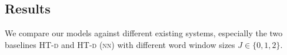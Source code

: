 \documentclass[11pt,a4paper]{article}
\begin{document}
{{%
%	

\subsection{Results}
We compare our models against different existing systems, especially the two baselines \textsc{HT-d} \cite{Luw:15} and \textsc{HT-d} \textsc{(nn)} \cite{Rhs:17} with different word window sizes $J \in \{0,1,2\}$.

}}
\end{document}
